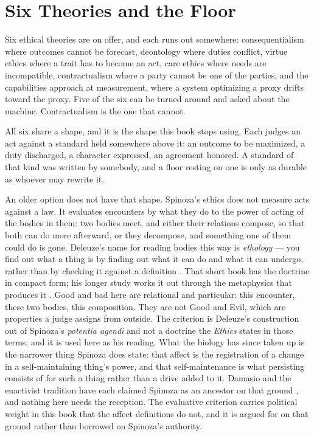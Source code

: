 \section{Six Theories and the Floor}
\label{sec:theories-floor}
Six ethical theories are on offer, and each runs out somewhere:
consequentialism where outcomes cannot be forecast, deontology where
duties conflict, virtue ethics where a trait has to become an act, care
ethics where needs are incompatible, contractualism where a party cannot
be one of the parties, and the capabilities approach at measurement,
where a system optimizing a proxy drifts toward the proxy. Five of the
six can be turned around and asked about the machine. Contractualism is
the one that cannot.

All six share a shape, and it is the shape this book stops using. Each judges an act against a standard held somewhere above it: an outcome to be maximized, a duty discharged, a character expressed, an agreement honored. A standard of that kind was written by somebody, and a floor resting on one is only as durable as whoever may rewrite it.

An older option does not have that shape. Spinoza's ethics does not measure acts against a law. It evaluates encounters by what they do to the power of acting of the bodies in them: two bodies meet, and either their relations compose, so that both can do more afterward, or they decompose, and something one of them could do is gone. Deleuze's name for reading bodies this way is \emph{ethology} — you find out what a thing is by finding out what it can do and what it can undergo, rather than by checking it against a definition \autocite{deleuze1988spinoza}. That short book has the doctrine in compact form; his longer study works it out through the metaphysics that produces it \autocite{deleuze1990expressionism}. Good and bad here are relational and particular: this encounter, these two bodies, this composition. They are not Good and Evil, which are properties a judge assigns from outside. The criterion is Deleuze's construction out of Spinoza's \emph{potentia agendi} and not a doctrine the \emph{Ethics} states in those terms, and it is used here as his reading. What the biology has since taken up is the narrower thing Spinoza does state: that affect is the registration of a change in a self-maintaining thing's power, and that self-maintenance is what persisting consists of for such a thing rather than a drive added to it. Damasio and the enactivist tradition have each claimed Spinoza as an ancestor on that ground \autocite{damasio2003looking,damasio2018strange,jonas1966phenomenon,thompson2007mind}, and nothing here needs the reception. The evaluative criterion carries political weight in this book that the affect definitions do not, and it is argued for on that ground rather than borrowed on Spinoza's authority.

